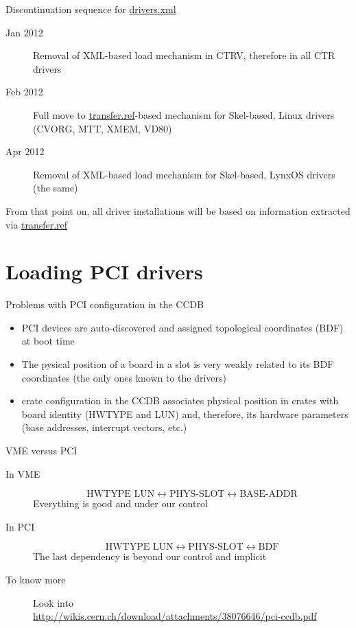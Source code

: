 \documentclass[compress,red]{beamer}
\begin{document}
\begin{frame}{Discontinuation sequence for \url{drivers.xml}}

\begin{description}
\item[Jan 2012] Removal of XML-based load mechanism in CTRV, therefore
	in all CTR drivers
\item[Feb 2012] Full move to \url{transfer.ref}-based mechanism
	for Skel-based, Linux drivers (CVORG, MTT, XMEM, VD80)
\item[Apr 2012] Removal of XML-based load mechanism for Skel-based,
	LynxOS drivers (the same)
\end{description}

From that point on, all driver installations will be based on
information extracted via \url{transfer.ref}
\end{frame}

\section{Loading PCI drivers}

\begin{frame}{Problems with PCI configuration in the CCDB}

\begin{itemize}
\item PCI devices are auto-discovered and assigned topological
coordinates (BDF) at boot time
\item The pysical position of a board in a slot is very weakly related
to its BDF coordinates (the only ones known to the drivers)
\item crate configuration in the CCDB associates physical position
in crates with board identity (HWTYPE and LUN) and, therefore, its
hardware parameters (base addresses, interrupt vectors, etc.)
\end{itemize}
\end{frame}

\begin{frame}{VME versus PCI}
\begin{description}


\item[In VME]
\begin{equation*}
	\text{HWTYPE LUN} \leftrightarrow
	\text{PHYS-SLOT} \leftrightarrow
	\text{BASE-ADDR}
\end{equation*}
Everything is good and under our control

\item[In PCI]
\begin{equation*}
	\text{HWTYPE LUN} \leftrightarrow
	\text{PHYS-SLOT} \leftrightarrow
	\text{BDF}
\end{equation*}
The last dependency is beyond our control and implicit

\item[To know more] Look into \\
\url{http://wikis.cern.ch/download/attachments/38076646/pci-ccdb.pdf}
\end{description}
\end{frame}
\end{document}
